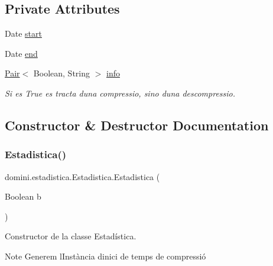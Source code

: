\subsection*{Private Attributes}
\begin{DoxyCompactItemize}
\item 
Date \hyperlink{classdomini_1_1estadistica_1_1Estadistica_aee0ae604272563ceab4e61392cbd343e}{start}
\item 
Date \hyperlink{classdomini_1_1estadistica_1_1Estadistica_ae99e664f0569e308009ec7ca32864006}{end}
\item 
\hyperlink{classdomini_1_1utils_1_1Pair}{Pair}$<$ Boolean, String $>$ \hyperlink{classdomini_1_1estadistica_1_1Estadistica_a57776a71683b3717b638377073b8a99e}{info}
\begin{DoxyCompactList}\small\item\em Si es True es tracta d\textquotesingle{}una compressio, sino d\textquotesingle{}una descompressio. \end{DoxyCompactList}\end{DoxyCompactItemize}


\subsection{Constructor \& Destructor Documentation}
\mbox{\label{classdomini_1_1estadistica_1_1Estadistica_aab5e956c9a7e31945ddf93cb4f332746}} 
\subsubsection{\texorpdfstring{Estadistica()}{Estadistica()}}
{\footnotesize\ttfamily domini.\+estadistica.\+Estadistica.\+Estadistica (\begin{DoxyParamCaption}\item[{Boolean}]{b }\end{DoxyParamCaption})\hspace{0.3cm}{\ttfamily [inline]}}



Constructor de la classe Estadística. 

\begin{DoxyNote}{Note}
Generem l\textquotesingle{}Instància d\textquotesingle{}inici de temps de compressió 
\end{DoxyNote}

